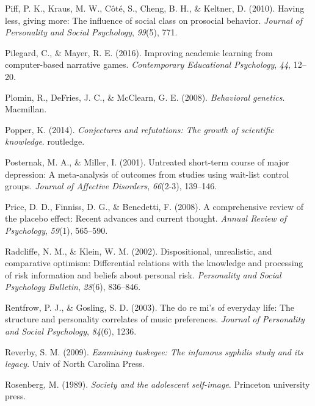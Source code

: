 \documentclass[
]{krantz}
\newlength{\cslhangindent}
\newenvironment{CSLReferences}[2] %
 {\begin{list}{}{%
  \setlength{\itemindent}{0pt}
  \setlength{\leftmargin}{0pt}
  \setlength{\parsep}{0pt}
  \ifodd #1
   \setlength{\leftmargin}{\cslhangindent}
   \setlength{\itemindent}{-1\cslhangindent}
  \fi
  \setlength{\itemsep}{#2\baselineskip}}}
 {\end{list}}
\begin{document}
\begin{CSLReferences}{1}{0}
Piff, P. K., Kraus, M. W., Côté, S., Cheng, B. H., \& Keltner, D. (2010). Having less, giving more: The influence of social class on prosocial behavior. \emph{Journal of Personality and Social Psychology}, \emph{99}(5), 771.

Pilegard, C., \& Mayer, R. E. (2016). Improving academic learning from computer-based narrative games. \emph{Contemporary Educational Psychology}, \emph{44}, 12--20.

Plomin, R., DeFries, J. C., \& McClearn, G. E. (2008). \emph{Behavioral genetics}. Macmillan.

Popper, K. (2014). \emph{Conjectures and refutations: The growth of scientific knowledge}. routledge.

Posternak, M. A., \& Miller, I. (2001). Untreated short-term course of major depression: A meta-analysis of outcomes from studies using wait-list control groups. \emph{Journal of Affective Disorders}, \emph{66}(2-3), 139--146.

Price, D. D., Finniss, D. G., \& Benedetti, F. (2008). A comprehensive review of the placebo effect: Recent advances and current thought. \emph{Annual Review of Psychology}, \emph{59}(1), 565--590.

Radcliffe, N. M., \& Klein, W. M. (2002). Dispositional, unrealistic, and comparative optimism: Differential relations with the knowledge and processing of risk information and beliefs about personal risk. \emph{Personality and Social Psychology Bulletin}, \emph{28}(6), 836--846.

Rentfrow, P. J., \& Gosling, S. D. (2003). The do re mi's of everyday life: The structure and personality correlates of music preferences. \emph{Journal of Personality and Social Psychology}, \emph{84}(6), 1236.

Reverby, S. M. (2009). \emph{Examining tuskegee: The infamous syphilis study and its legacy}. Univ of North Carolina Press.

Rosenberg, M. (1989). \emph{Society and the adolescent self-image}. Princeton university press.


\end{CSLReferences}
\end{document}
